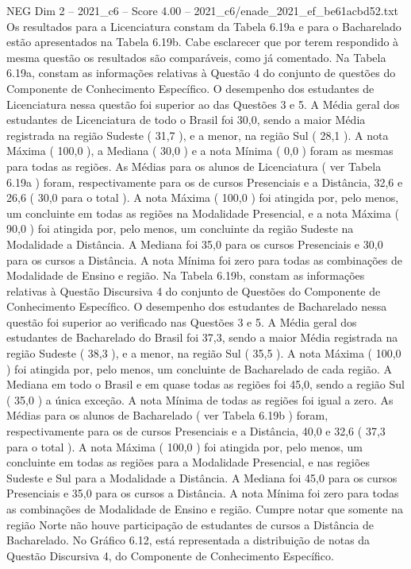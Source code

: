 \begin{textsample}{NEG Dim 2 – 2021\_c6 – Score 4.00 – 2021\_c6/enade\_2021\_ef\_be61acbd52.txt}
Os resultados para a Licenciatura constam da Tabela 6.19a e para o Bacharelado estão apresentados na Tabela 6.19b.
Cabe esclarecer que por terem respondido à mesma questão os resultados são comparáveis, como já comentado.
Na Tabela 6.19a, constam as informações relativas à Questão 4 do conjunto de questões do Componente de Conhecimento Específico.
O desempenho dos estudantes de Licenciatura nessa questão foi superior ao das Questões 3 e 5.
A Média geral dos estudantes de Licenciatura de todo o Brasil foi 30,0, sendo a maior Média registrada na região Sudeste ( 31,7 ), e a menor, na região Sul ( 28,1 ).
A nota Máxima ( 100,0 ), a Mediana ( 30,0 ) e a nota Mínima ( 0,0 ) foram as mesmas para todas as regiões.
As Médias para os alunos de Licenciatura ( ver Tabela 6.19a ) foram, respectivamente para os de cursos Presenciais e a Distância, 32,6 e 26,6 ( 30,0 para o total ).
A nota Máxima ( 100,0 ) foi atingida por, pelo menos, um concluinte em todas as regiões na Modalidade Presencial, e a nota Máxima ( 90,0 ) foi atingida por, pelo menos, um concluinte da região Sudeste na Modalidade a Distância.
A Mediana foi 35,0 para os cursos Presenciais e 30,0 para os cursos a Distância.
A nota Mínima foi zero para todas as combinações de Modalidade de Ensino e região.
Na Tabela 6.19b, constam as informações relativas à Questão Discursiva 4 do conjunto de Questões do Componente de Conhecimento Específico.
O desempenho dos estudantes de Bacharelado nessa questão foi superior ao verificado nas Questões 3 e 5.
A Média geral dos estudantes de Bacharelado do Brasil foi 37,3, sendo a maior Média registrada na região Sudeste ( 38,3 ), e a menor, na região Sul ( 35,5 ).
A nota Máxima ( 100,0 ) foi atingida por, pelo menos, um concluinte de Bacharelado de cada região.
A Mediana em todo o Brasil e em quase todas as regiões foi 45,0, sendo a região Sul ( 35,0 ) a única exceção.
A nota Mínima de todas as regiões foi igual a zero.
As Médias para os alunos de Bacharelado ( ver Tabela 6.19b ) foram, respectivamente para os de cursos Presenciais e a Distância, 40,0 e 32,6 ( 37,3 para o total ).
A nota Máxima ( 100,0 ) foi atingida por, pelo menos, um concluinte em todas as regiões para a Modalidade Presencial, e nas regiões Sudeste e Sul para a Modalidade a Distância.
A Mediana foi 45,0 para os cursos Presenciais e 35,0 para os cursos a Distância.
A nota Mínima foi zero para todas as combinações de Modalidade de Ensino e região.
Cumpre notar que somente na região Norte não houve participação de estudantes de cursos a Distância de Bacharelado.
No Gráfico 6.12, está representada a distribuição de notas da Questão Discursiva 4, do Componente de Conhecimento Específico.

\end{textsample}
